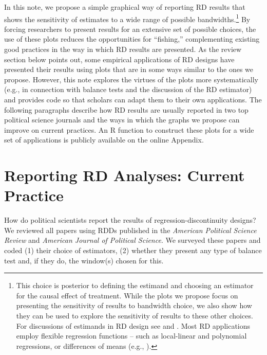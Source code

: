\documentclass[letterpaper,twoside,12pt]{article}
\begin{document}
In this note, we propose a simple graphical way of reporting RD results that shows the sensitivity of estimates to a wide range of possible bandwidths.\footnote{
This choice is posterior to defining the estimand and choosing an estimator for the causal effect of treatment. While the plots we propose focus on presenting the sensitivity of results to bandwidth choice, we also show how they can be used to explore the sensitivity of results to these other choices. For discussions of estimands in RD design see \citet{dunning2012natural} and \citet{calonico2015robust}. Most RD applications employ flexible regression functions -- such as local-linear and polynomial regressions, or differences  of means (e.g., \citet{imbens2008regression, lee2008randomized, dunning2012natural}).} By forcing researchers to present results for an extensive set of possible choices, the use of these plots reduces the opportunities for ``fishing,'' complementing existing good practices in the way in which RD results are presented. As the review section below points out, some empirical applications of RD designs have presented their results using plots that are in some ways similar to the ones we propose. However, this note explores the virtues of the plots more systematically (e.g., in connection with balance tests and the discussion of the RD estimator) and provides code so that scholars can adapt them to their own applications. The following paragraphs describe how RD results are usually reported in two top political science journals and the ways in which the graphs we propose can improve on current practices. An R function to construct these plots for a wide set of applications is publicly available on the online Appendix.

\section{Reporting RD Analyses: Current Practice}
	
How do political scientists report the results of regression-discontinuity designs? We reviewed all papers using RDDs published in the \emph{American Political Science Review} and \emph{American Journal of Political Science}.  We surveyed these papers and coded (1) their choice of estimators, (2) whether they present any type of balance test and, if they do, the window(s) chosen for this.
\end{document}
